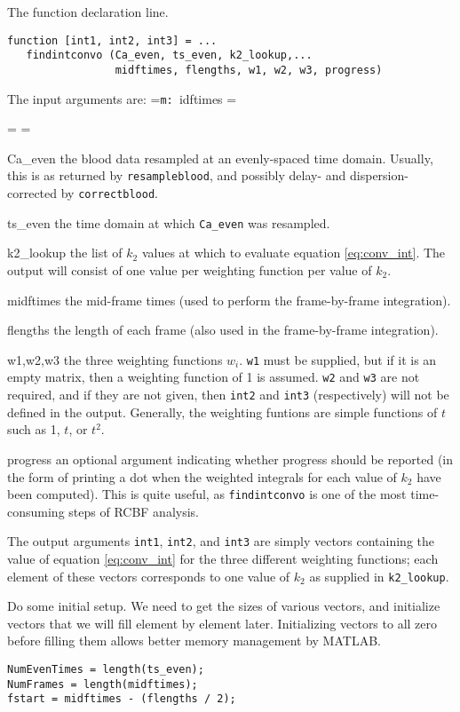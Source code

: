 \documentclass[12pt]{article}
\def\code#1{{\tt #1}}
\def\ttlabel#1{{\tt #1: }}
\newenvironment{ttdescription}[1]
{\newbox\holder
 \setbox\holder=\hbox{\ttlabel#1}
 \dimen0=\wd\holder
 \begin{list}{}
 {\labelsep=-0.25in
  \rightmargin=0.25in
  \leftmargin=\dimen0
  \addtolength{\leftmargin}{0.25in}
  \labelwidth=\leftmargin
  \let\makelabel\ttlabel}}%
{\end{list}}
\begin{document}
\begin{enumerate}
%
\item The function declaration line.
\begin{verbatim}
function [int1, int2, int3] = ...
   findintconvo (Ca_even, ts_even, k2_lookup,...
                 midftimes, flengths, w1, w2, w3, progress)
\end{verbatim}
The input arguments are:
\begin{ttdescription}{midftimes}
\item[Ca\_even]the blood data resampled at an evenly-spaced time
  domain.  Usually, this is as returned by \code{resampleblood}, and
  possibly delay- and dispersion-corrected by \code{correctblood}.
\item[ts\_even]the time domain at which \code{Ca\_even} was resampled.
\item[k2\_lookup]the list of $k_2$ values at which to evaluate equation
  \ref{eq:conv_int}.  The output will consist of one value per
  weighting function per value of $k_2$.
\item[midftimes]the mid-frame times (used to perform the
  frame-by-frame integration).
\item[flengths]the length of each frame (also used in the
  frame-by-frame integration).
\item[w1,w2,w3]the three weighting functions $w_i$.  \code{w1} must be
  supplied, but if it is an empty matrix, then a weighting function of
  1 is assumed.  \code{w2} and \code{w3} are not required, and if they
  are not given, then \code{int2} and \code{int3} (respectively) will
  not be defined in the output.  Generally, the weighting funtions are
  simple functions of $t$ such as 1, $t$, or $t^2$.
\item[progress]an optional argument indicating whether progress should
  be reported (in the form of printing a dot when the weighted
  integrals for each value of $k_2$ have been computed).  This is
  quite useful, as \code{findintconvo} is one of the most
  time-consuming steps of RCBF analysis.
\end{ttdescription}

The output arguments \code{int1}, \code{int2}, and \code{int3} are
simply vectors containing the value of equation \ref{eq:conv_int} for
the three different weighting functions; each element of these vectors
corresponds to one value of $k_2$ as supplied in \code{k2\_lookup}.

\item Do some initial setup.  We need to get the sizes of various
vectors, and initialize vectors that we will fill element by element
later.  Initializing vectors to all zero before filling them allows
better memory management by MATLAB.
\begin{verbatim}
NumEvenTimes = length(ts_even);
NumFrames = length(midftimes);
fstart = midftimes - (flengths / 2);


\end{verbatim}
\end{enumerate}
\end{document}
